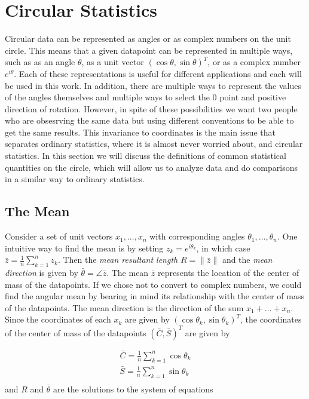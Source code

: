 \documentclass[12pt]{article}
\numberwithin{equation}{section}
\numberwithin{figure}{section}
\begin{document}
\section{Circular Statistics}

Circular data can be represented as angles or as complex numbers on the unit circle. This means that a given datapoint can be represented in multiple ways, such as as an angle $\theta$, as a unit vector $(\cos \theta, \sin \theta)^T$, or as a complex number $e^{i\theta}$. Each of these representations is useful for different applications and each will be used in this work. In addition, there are multiple ways to represent the values of the angles themselves and multiple ways to select the $0$ point and positive direction of rotation. However, in spite of these possibilities we want two people who are obsesrving the same data but using different conventions to be able to get the same results. This invariance to coordinates is the main issue that separates ordinary statistics, where it is almost never worried about, and circular statistics. In this section we will discuss the definitions of common statistical quantities on the circle, which will allow us to analyze data and do comparisons in a similar way to ordinary statistics.

\subsection{The Mean}\label{mean}

Consider a set of unit vectors $x_1, ..., x_n$ with corresponding angles $\theta_1, ..., \theta_n$. One intuitive way to find the mean is by setting $z_k = e^{i \theta_k}$, in which case $\bar{z} = \frac{1}{n}\sum_{k=1}^n z_k$. Then the \textit{mean resultant length} $R = \|\bar{z}\|$ and the \textit{mean direction} is given by $\bar{\theta} = \angle \bar{z}$. The mean $\bar{z}$ represents the location of the center of mass of the datapoints. If we chose not to convert to complex numbers, we could find the angular mean by bearing in mind its relationship with the center of mass of the datapoints. The mean direction is the direction of the sum $x_1+...+x_n$. Since the coordinates of each $x_k$ are given by $(\cos \theta_k, \sin \theta_k)^T$, the coordinates of the center of mass of the datapoints $(\bar{C}, \bar{S})^T$ are given by 

\begin{equation}\label{eq:CandS}
\begin{aligned}
\bar{C} = \frac{1}{n}\sum_{k=1}^n \cos \theta_k \\
\bar{S} = \frac{1}{n}\sum_{k=1}^n \sin \theta_k \\
\end{aligned}
\end{equation}
and $R$ and $\bar{\theta}$ are the solutions to the system of equations
\end{document}

